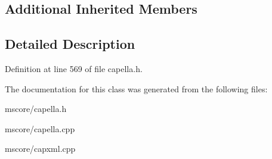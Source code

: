 \subsection*{Additional Inherited Members}


\subsection{Detailed Description}


Definition at line 569 of file capella.\+h.



The documentation for this class was generated from the following files\+:\begin{DoxyCompactItemize}
\item 
mscore/capella.\+h\item 
mscore/capella.\+cpp\item 
mscore/capxml.\+cpp\end{DoxyCompactItemize}
